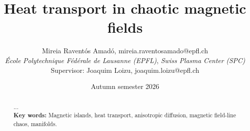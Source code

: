 \documentclass[11pt,a4paper]{article}
\title{\bfseries Heat transport in chaotic magnetic fields}
\author{
Mireia Raventós Amadó, mireia.raventosamado@epfl.ch\\[0.1em]
\textit{École Polytechnique Fédérale de Lausanne (EPFL)}, 
\textit{Swiss Plasma Center (SPC)}\\[0.8em]
Supervisor: Joaquim Loizu, joaquim.loizu@epfl.ch
}
\date{Autumn semester 2026}
\begin{document}
\maketitle

\begin{abstract}
... 
\\
\textbf{Key words:} Magnetic islands, heat transport, anisotropic diffusion, magnetic field-line chaos, manifolds.
\end{abstract}









\clearpage
\appendix
% 

\clearpage
%  
\end{document}
